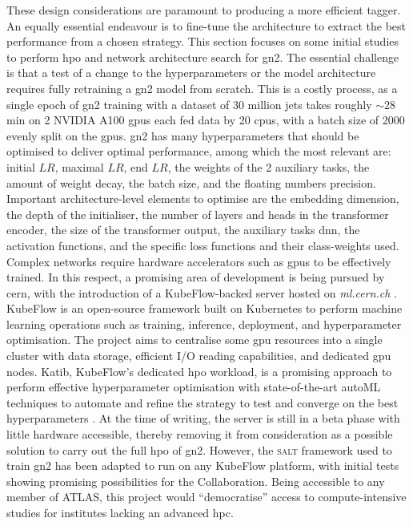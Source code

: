 These design considerations are paramount to producing a more efficient tagger. An equally essential endeavour is to fine-tune the architecture to extract the best performance from a chosen strategy. This section focuses on some initial studies to perform \gls{hpo} and network architecture search for \gls{gn2}. The essential challenge is that a test of a change to the hyperparameters or the model architecture requires fully retraining a \gls{gn2} model from scratch. This is a costly process, as a single epoch of \gls{gn2} training with a dataset of 30 million jets takes roughly $\sim$28 min on 2 NVIDIA A100 \glspl{gpu} each fed data by 20 \glspl{cpu}, with a batch size of 2000 evenly split on the \glspl{gpu}. \gls{gn2} has many hyperparameters that should be optimised to deliver optimal performance, among which the most relevant are: initial $LR$, maximal $LR$, end $LR$, the weights of the 2 auxiliary tasks, the amount of weight decay, the batch size, and the floating numbers precision. Important architecture-level elements to optimise are the embedding dimension, the depth of the initialiser, the number of layers and heads in the transformer encoder, the size of the transformer output, the auxiliary tasks \gls{dnn}, the activation functions, and the specific loss functions and their class-weights used. \\

Complex networks require hardware accelerators such as \glspl{gpu} to be effectively trained. In this respect, a promising area of development is being pursued by \gls{cern}, with the introduction of a KubeFlow-backed server hosted on \textit{ml.cern.ch} \cite{KubeFlowCern}. KubeFlow is an open-source framework built on Kubernetes to perform machine learning operations such as training, inference, deployment, and hyperparameter optimisation. The project aims to centralise some \gls{gpu} resources into a single cluster with data storage, efficient I/O reading capabilities, and dedicated \gls{gpu} nodes. Katib, KubeFlow's dedicated \gls{hpo} workload, is a promising approach to perform effective hyperparameter optimisation with state-of-the-art autoML techniques to automate and refine the strategy to test and converge on the best hyperparameters \cite{george2020katib}. At the time of writing, the server is still in a beta phase with little hardware accessible, thereby removing it from consideration as a possible solution to carry out the full \gls{hpo} of \gls{gn2}. However, the \textsc{salt} framework used to train \gls{gn2} has been adapted to run on any KubeFlow platform, with initial tests showing promising possibilities for the Collaboration. Being accessible to any member of ATLAS, this project would ``democratise'' access to compute-intensive studies for institutes lacking an advanced \gls{hpc}. \\

